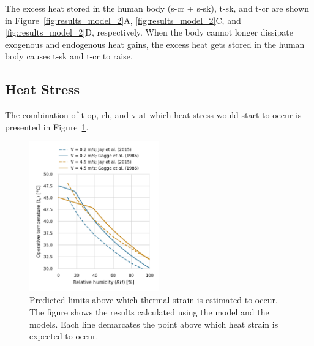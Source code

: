 The excess heat stored in the human body (\acs{s-cr} + \acs{s-sk}), \ac{t-sk}, and \ac{t-cr} are shown in Figure~\ref{fig:results_model_2}A, \ref{fig:results_model_2}C, and \ref{fig:results_model_2}D, respectively.
When the body cannot longer dissipate exogenous and endogenous heat gains, the excess heat gets stored in the human body causes \ac{t-sk} and \ac{t-cr} to raise.

\subsection{Heat Stress}\label{subsec:heat-stress}

The combination of \ac{t-op}, \ac{rh}, and \ac{v} at which heat stress would start to occur is presented in Figure~\ref{fig:comparison_air_speed}.

\begin{figure}[thb!]
    \centering
    \includegraphics[width=0.5\textwidth]{figures/comparison_air_speed}
    \caption{Predicted limits above which thermal strain is estimated to occur.
    The figure shows the results calculated using the  model and the  models.
    Each line demarcates the point above which heat strain is expected to occur.}
    \label{fig:comparison_air_speed}
\end{figure}

